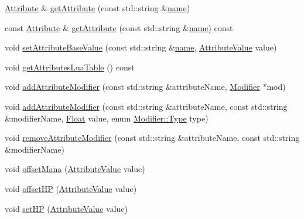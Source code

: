 \begin{DoxyCompactItemize}
\item 
\hyperlink{classZeta_1_1Attribute}{Attribute} \& \hyperlink{classZeta_1_1Lifeform_a8008efe18a65460dab2ca60464b1e71d}{get\+Attribute} (const std\+::string \&\hyperlink{classZeta_1_1Object_ace4ef81b7c300e0a170292e9888cd66f}{name})
\item 
const \hyperlink{classZeta_1_1Attribute}{Attribute} \& \hyperlink{classZeta_1_1Lifeform_a9ea8d04a84705bb2070ec0105e7bbfcb}{get\+Attribute} (const std\+::string \&\hyperlink{classZeta_1_1Object_ace4ef81b7c300e0a170292e9888cd66f}{name}) const 
\item 
void \hyperlink{classZeta_1_1Lifeform_a81fed62e1dc53f02584d56ee42f56723}{set\+Attribute\+Base\+Value} (const std\+::string \&\hyperlink{classZeta_1_1Object_ace4ef81b7c300e0a170292e9888cd66f}{name}, \hyperlink{namespaceZeta_ab5947f98c0ab6302b51f8c6e93ec5581}{Attribute\+Value} value)
\item 
void \hyperlink{classZeta_1_1Lifeform_adf8702f7e1e454d5002eeaa5b63f173d}{get\+Attributes\+Lua\+Table} () const 
\item 
void \hyperlink{classZeta_1_1Lifeform_ab1cf0a00f58435f9e7661b95252ae8bf}{add\+Attribute\+Modifier} (const std\+::string \&attribute\+Name, \hyperlink{classZeta_1_1Modifier}{Modifier} $\ast$mod)
\item 
void \hyperlink{classZeta_1_1Lifeform_a4dcdd3ab52f7053d1fb69c4ba57342e5}{add\+Attribute\+Modifier} (const std\+::string \&attribute\+Name, const std\+::string \&modifier\+Name, \hyperlink{namespaceZeta_a1e0a1265f9b3bd3075fb0fabd39088ba}{Float} value, enum \hyperlink{classZeta_1_1Modifier_a0081811b87d3bc0fc672b9773951d0b7}{Modifier\+::\+Type} type)
\item 
void \hyperlink{classZeta_1_1Lifeform_ae8ce74f9117ed7b78b97f9f965085b68}{remove\+Attribute\+Modifier} (const std\+::string \&attribute\+Name, const std\+::string \&modifier\+Name)
\item 
void \hyperlink{classZeta_1_1Lifeform_a44a93a5a48a6327a97e532f95a52ba68}{offset\+Mana} (\hyperlink{namespaceZeta_ab5947f98c0ab6302b51f8c6e93ec5581}{Attribute\+Value} value)
\item 
void \hyperlink{classZeta_1_1Lifeform_adb9c90bcd004c46ed69a1b1e0975d27d}{offset\+H\+P} (\hyperlink{namespaceZeta_ab5947f98c0ab6302b51f8c6e93ec5581}{Attribute\+Value} value)
\item 
void \hyperlink{classZeta_1_1Lifeform_a7e05ceca459cc1da9ebc73cfa65ec54a}{set\+H\+P} (\hyperlink{namespaceZeta_ab5947f98c0ab6302b51f8c6e93ec5581}{Attribute\+Value} value)
\item 

\end{DoxyCompactItemize}
